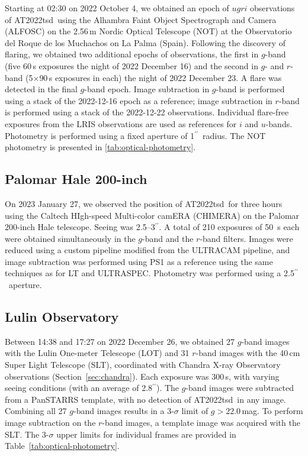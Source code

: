 \documentclass{nature_plusfigure}
\newcommand{\at}{AT2022tsd}
\newcommand{\arcsec}{$^{\prime\prime}$}
\begin{document}
\begin{methods}
Starting at 02:30 on 2022 October 4, we obtained an epoch of $ugri$ observations of \at\ using the Alhambra Faint Object Spectrograph and Camera (ALFOSC) on the 2.56\,m Nordic Optical Telescope (NOT) at the Observatorio del Roque de los Muchachos on La Palma (Spain). Following the discovery of flaring, we obtained two additional epochs of observations, the first in $g$-band (five 60\,s exposures the night of 2022 December 16) and the second in $g$- and $r$-band (5$\times$90\,s exposures in each) the night of 2022 December 23. A flare was detected in the final $g$-band epoch.  Image subtraction in $g$-band is performed using a stack of the 2022-12-16 epoch as a reference; image subtraction in $r$-band is performed using a stack of the 2022-12-22 observations.  Individual flare-free exposures from the LRIS observations are used as references for $i$ and $u$-bands.  Photometry is performed using a fixed aperture of 1\arcsec\ radius.
The NOT photometry is presented in \ref{tab:optical-photometry}.

\subsection{Palomar Hale 200-inch}
\label{sec:chimera}

On 2023 January 27, we observed the position of \at\ for three hours using the Caltech HIgh-speed Multi-color camERA (CHIMERA\cite{Harding2016}) on the Palomar 200-inch Hale telescope. Seeing was 2.5--3\arcsec.
A total of 210 exposures of 50~s each were obtained simultaneously in the $g$-band and the $r$-band filters. Images were reduced using a custom pipeline modified from the ULTRACAM pipeline\cite{Dhillon2007}, and image subtraction was performed using PS1 as a reference using the same techniques as for LT and ULTRASPEC. Photometry was performed using a 2.5\arcsec\ aperture.

\subsection{Lulin Observatory}
\label{sec:lulin}

Between 14:38 and 17:27 on 2022 December 26, we obtained 
27 $g$-band images with the Lulin One-meter Telescope (LOT) and 31 $r$-band images with the 40\,cm Super Light Telescope (SLT), coordinated with Chandra X-ray Observatory observations (Section~\ref{sec:chandra}). Each exposure was 300\,s, with varying seeing conditions (with an average of 2.8\arcsec). The $g$-band images were subtracted from a PanSTARRS template, with no detection of \at\ in any image.
Combining all 27 $g$-band images results in a 3-$\sigma$ limit of $g>22.0$\,mag.
To perform image subtraction on the $r$-band images, a template image was acquired with the SLT.
The 3-$\sigma$ upper limits for individual frames are provided in Table~\ref{tab:optical-photometry}.


\end{methods}
\end{document}
